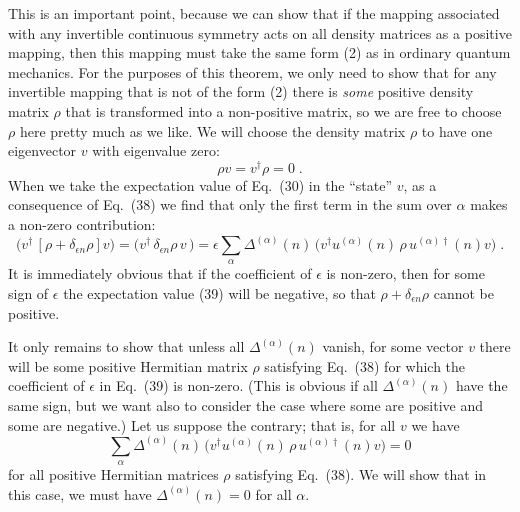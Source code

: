 This is an important point, because we can show that if the mapping associated with  any invertible continuous symmetry  acts on all density matrices as a positive mapping, then this mapping must take the same form (2)  as in ordinary quantum mechanics.  For the purposes of this theorem, we only need to show that for any invertible mapping that is not of the form (2) there is  {\it some} positive density matrix $\rho$ that is transformed into a non-positive matrix, so we are free to choose $\rho$ here pretty much as we like.  We will choose the density matrix $\rho$ to have  one  eigenvector $v$ with eigenvalue zero:
\begin{equation}
\rho v=v^\dagger\rho=0\;.
\end{equation}
When we take the  expectation value of Eq.~(30) in the ``state'' $v$, as a consequence of Eq.~(38) we find that only  the first term in the sum over $\alpha$ makes a non-zero contribution:
\begin{equation}
\Big(v^\dagger \,[\rho+\delta_{\epsilon n}\rho]v\Big)= \Big(v^\dagger\, \delta_{\epsilon n}\rho\, v\,\Big)=\epsilon\sum_\alpha  \Delta^{(\alpha)}(n)\, \Big(v^\dagger u^{(\alpha)}(n)\,\rho\, u^{(\alpha)\dagger}(n)v\Big)\;.
\end{equation}
It is immediately obvious that if the coefficient of $\epsilon$ is non-zero, then for some sign of $\epsilon$ the expectation value (39) will be negative, so that
$\rho+\delta_{\epsilon n}\rho$ cannot be positive.  

It only remains to show that unless all $\Delta^{(\alpha)}(n)$ vanish, for some  vector $v$ there will be some positive Hermitian matrix $\rho$ satisfying Eq.~(38) for which the coefficient of $\epsilon$ in Eq.~(39) is non-zero.  (This is obvious if all $\Delta^{(\alpha)}(n)$ have the same sign, but we want also to consider the case where some are positive and some are negative.)  Let us suppose the contrary; that is, for all $v$ we have 
\begin{equation}
\sum_\alpha  \Delta^{(\alpha)}(n)\,\Big( v^\dagger u^{(\alpha)}(n)\,\rho\, u^{(\alpha)\dagger}(n)v\Big) =0
\end{equation}
for all positive Hermitian matrices $\rho$ satisfying Eq.~(38).  We will show that in this case, we must have $\Delta^{(\alpha)}(n)=0$ for all $\alpha$.  

